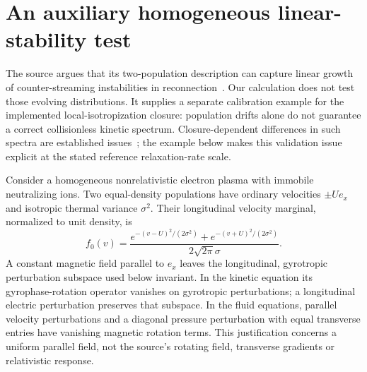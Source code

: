 \section{An auxiliary homogeneous linear-stability test}
\label{sec:stability}
The source argues that its two-population description can capture linear
growth of counter-streaming instabilities in reconnection~\cite{original}.
Our calculation does not test those evolving distributions. It supplies a
separate calibration example for the implemented local-isotropization closure:
population drifts alone do not guarantee a correct collisionless kinetic
spectrum. Closure-dependent differences in such spectra are established
issues~\cite{ng2019,wang2015}; the example below makes this validation issue
explicit at the stated reference relaxation-rate scale.

Consider a homogeneous nonrelativistic electron plasma with immobile
neutralizing ions. Two equal-density populations have ordinary velocities
$\pm Ue_x$ and isotropic thermal variance $\sigma^2$. Their longitudinal
velocity marginal, normalized to unit density, is
\begin{equation}
 f_0(v)=\frac{
 e^{-(v-U)^2/(2\sigma^2)}+e^{-(v+U)^2/(2\sigma^2)}
 }{2\sqrt{2\pi}\sigma}.
 \label{eq:kinetic-equilibrium}
\end{equation}
A constant magnetic field parallel to $e_x$ leaves the longitudinal,
gyrotropic perturbation subspace used below invariant.
In the kinetic equation its gyrophase-rotation operator vanishes on
gyrotropic perturbations; a longitudinal electric perturbation preserves that
subspace. In the fluid equations, parallel velocity perturbations and a
diagonal pressure perturbation with equal transverse entries have vanishing
magnetic rotation terms. This justification concerns a uniform parallel field,
not the source's rotating field, transverse gradients or relativistic response.


